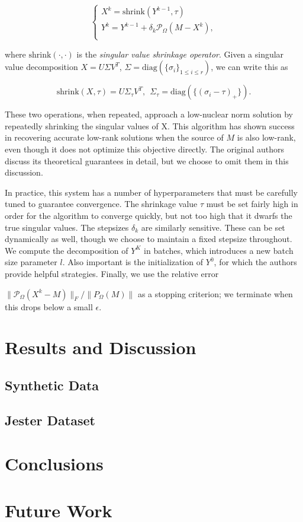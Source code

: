 \documentclass{article} %
\begin{document}
\begin{equation*}
\begin{cases}
X^{k} = \mathrm{shrink}(Y^{k-1}, \tau) \\
Y^{k} = Y^{k-1} + \delta_k \mathcal{P}_\Omega (M-X^{k}),              \\
\end{cases}
\end{equation*}

where $\mathrm{shrink}(\cdot, \cdot)$ is the \emph{singular value
  shrinkage operator}. Given a singular value decomposition $X = U
\Sigma V^T$, $\Sigma = \mathrm{diag}(\{\sigma_i\}_{1 \le i \le r})$, we
  can write this as

\begin{equation*}
\mathrm{shrink}(X, \tau) = U\Sigma_\tau V^T, \ \ \Sigma_\tau = \mathrm{diag}(\{(\sigma_i-\tau)_{+}\}).
\end{equation*} 

These two operations, when repeated, approach a low-nuclear norm
solution by repeatedly shrinking the singular values of X. This
algorithm has shown success in recovering accurate low-rank solutions
when the source of $M$ is also low-rank, even though it does not
optimize this objective directly. The original authors discuss its
theoretical guarantees in detail, but we choose to omit them in this
discussion.

In practice, this system has a number of hyperparameters that must be
carefully tuned to guarantee convergence. The shrinkage value $\tau$
must be set fairly high in order for the algorithm to converge
quickly, but not too high that it dwarfs the true singular values. The
stepsizes $\delta_k$ are similarly sensitive. These can be set
dynamically as well, though we choose to maintain a fixed stepsize
throughout. We compute the decomposition of $Y^K$ in batches, which
introduces a new batch size parameter $l$. Also important is the
initialization of $Y^0$, for which the authors provide helpful
strategies. Finally, we use the relative error

$\|\mathcal{P}_{\Omega}(X^k-M)\|_F / \|P_{\Omega} (M)\|$ as a stopping
criterion; we terminate when this drops below a small $\epsilon$.



\section{Results and Discussion}
\subsection{Synthetic Data}

%

\subsection{Jester Dataset}

\section{Conclusions}

\section{Future Work}




\end{document}
